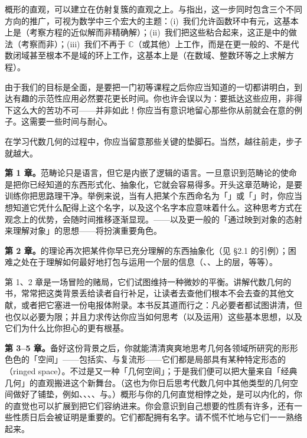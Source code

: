 概形的直观，可以建立在仿射复簇的直观之上。\trKnutson{}与\trTao{}指出，这一步同时包含三个不同方向的推广，可视为数学中三个宏大的主题：(i)~我们允许函数环中有\trNilpotent{}元，这基本上是\trAnalysis{}（考察方程的近似解而非精确解）；(ii)~我们把这些\trAffine\trScheme{}粘合起来，这正是\trDifferentialGeometry{}中的做法（考察\trManifold{}而非\trCoordinatePatch{}）；(iii)~我们不再于 $\mathbb{C}$（或其他\trAlgClosedField{}）上工作，而是在更一般的、不是代数闭域甚至根本不是域的环上工作，这基本上是\trNumberTheory{}（在数域、整数环等之上求解方程）。

由于我们的目标是全面，是要把一门初等课程之后你应当知道的一切都讲明白，到达有趣的示范性应用必然要花更长时间。你也许会误以为：要抵达这些应用，非得下这么大的苦功不可——并非如此！你应当有意识地留心那些你从前就会在意的例子。这需要一些时间与耐心。

在学习代数几何的过程中，你应当留意那些关键的垫脚石。当然，越往前走，步子就越大。

\noindent\textbf{第 1 章。}\quad 范畴论只是语言，但它是内嵌了逻辑的语言。一旦意识到范畴论的使命是把你已经知道的东西形式化、抽象化，它就会容易得多。开头这章范畴论，是要训练你把思路理干净。举例来说，当有人把某个东西命名为「\trCokernel{}」或「\trProduct{}」时，你应当想知道它凭什么配得上这个名字，以及这个名字本应意味着什么。这种思考方式在观念上的优势，会随时间推移逐渐显现。\trYonedaLemma{}——以及更一般的「通过映到对象的态射来理解对象」的思想——将扮演重要角色。

\noindent\textbf{第 2 章。}\quad \trSheaf{}的理论再次把某件你早已充分理解的东西抽象化（见 \S2.1 的引例）；困难之处在于理解如何最好地打包与运用一个层的信息（\trStalk、\trSheafification、\trBase{}上的层，等等）。

第 1、2 章是一场冒险的赌局，它们试图维持一种微妙的平衡。讲解代数几何的书，常常把这类背景丢给读者自行补足，让读者去查他们根本不会去查的其他文献，或者把它塞进一份电报体附录。本书反其道而行之：凡必要者都试图讲清，但也仅以必要为限；并且力求传达你应当如何思考（以及运用）这些基本思想，以及它们为什么比你担心的更有根基。

\noindent\textbf{第 3--5 章。}\quad 备好这份背景之后，你就能清清爽爽地思考几何各领域所研究的形形色色的「空间」——包括实\trManifold、\trTopologicalSpace{}与复流形——它们都是局部具有某种特定形态的\trRingedSpace{}（ringed space）。\trScheme{}不过是又一种「几何空间」；于是我们便可以把大量来自「经典几何」的直观搬进这个新舞台。（这也为你日后思考代数几何中其他类型的几何空间做好了铺垫，例如\trComplexAnalyticSpace、\trAlgebraicSpace、\trOrbifold、\trStack、\trRigidAnalyticSpace{}与\trFormalScheme。）概形与你的几何直觉相悖之处，是可以内化的，你的直觉也可以扩展到把它们容纳进来。你会意识到自己想要的性质有许多，还有一些性质日后会被证明是重要的。它们都配拥有名字。请不慌不忙地与它们一一熟络起来。

